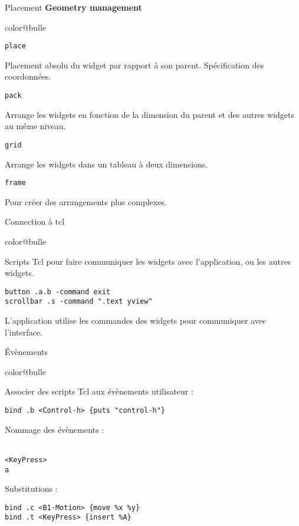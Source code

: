\documentclass[a4paper,landscape,smooth]{show}
\begin{document}
\begin{tslide}{Placement}
   \vfill
   {\bf Geometry management}
   \begin{bitemize}{color@bulle}
      \item {\tt place}

	 Placement absolu du widget par rapport à son parent. Spécification
	 des coordonnées.

      \item {\tt pack}
	 
	 Arrange les widgets en fonction de la dimension du parent et des
	 autres widgets au même niveau.

      \item {\tt grid}

	 Arrange les widgets dans un tableau à deux dimensions.
	 
      \item {\tt frame}
      
	 Pour créer des arrangements plus complexes.
   \end{bitemize}
   \vfill
\end{tslide}


\begin{tslide}{Connection à tcl}
   \vfill
   \begin{bitemize}{color@bulle}
      \item Scripts Tcl pour faire communiquer les widgets avec
	    l'application, ou les autres widgets.

	    {\tt button .a.b -command exit}\\
	    {\tt scrollbar .s -command ".text yview"}

      \item L'application utilise les commandes des widgets pour
	    communiquer avec l'interface.
   \end{bitemize}
   \vfill
\end{tslide}


\begin{tslide}{Évènements}
   \vfill
   \begin{bitemize}{color@bulle}
      \item Associer des scripts Tcl aux évènements utilisateur : 

         {\tt bind .b <Control-h> \{puts "control-h"\}}

      \item Nommage des évènements : 

	 {\tt <Double-Control-ButtonPress-1> \\
	       <KeyPress> \\
	       a}

      \item Substitutions : 

	 {\tt bind .c <B1-Motion> \{move \%x \%y\}\\
	       bind .t <KeyPress> \{insert \%A\}}
   \end{bitemize}
   \vfill
\end{tslide}
\end{document}
